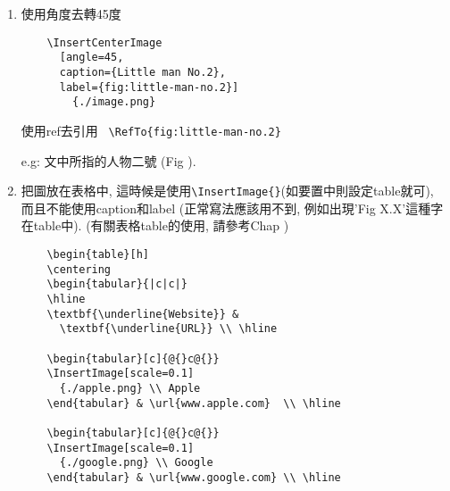 \begin{enumerate}
{    之後可以使用ref去引用 \verb| \RefTo{fig:little-man-no.1} |

    e.g: 文中所指的人物一號 (Fig ).
  } %

  \item
  {
    使用角度去轉45度
    \begin{verbatim}
    \InsertCenterImage
      [angle=45,
      caption={Little man No.2},
      label={fig:little-man-no.2}]
        {./image.png}
    \end{verbatim}

    使用ref去引用 \verb| \RefTo{fig:little-man-no.2} |

    e.g: 文中所指的人物二號 (Fig ).
  } %

  \newpage
  \item
  {
    把圖放在表格中, 這時候是使用\verb|\InsertImage{}|(如要置中則設定table就可), 而且不能使用caption和label (正常寫法應該用不到, 例如出現'Fig X.X'這種字在table中). (有關表格table的使用, 請參考Chap )

    \begin{verbatim}
    \begin{table}[h]
    \centering
    \begin{tabular}{|c|c|}
    \hline
    \textbf{\underline{Website}} &
      \textbf{\underline{URL}} \\ \hline

    \begin{tabular}[c]{@{}c@{}}
    \InsertImage[scale=0.1]
      {./apple.png} \\ Apple
    \end{tabular} & \url{www.apple.com}  \\ \hline

    \begin{tabular}[c]{@{}c@{}}
    \InsertImage[scale=0.1]
      {./google.png} \\ Google
    \end{tabular} & \url{www.google.com} \\ \hline


\end{verbatim}}
\end{enumerate}
